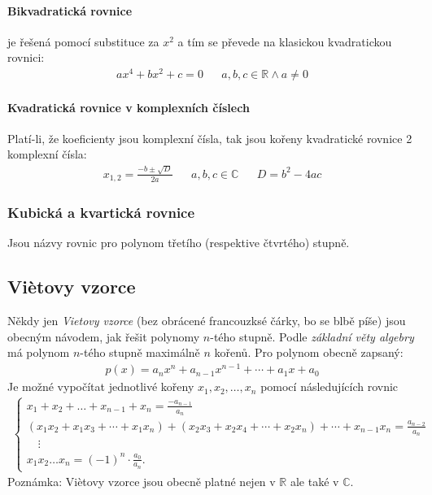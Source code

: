\documentclass[12pt]{article}
\newcommand{\nR}{\mathbb{R}} %
\newcommand{\nC}{\mathbb{C}} %
\begin{document}
\paragraph{Bikvadratická rovnice} je řešená pomocí substituce za $x^2$ a tím se převede na klasickou kvadratickou rovnici:
\begin{align}
ax^4 + bx^2 + c =0 && a,b,c \in \nR \land a \neq 0
\end{align}
\paragraph{Kvadratická rovnice v komplexních číslech}
Platí-li, že koeficienty jsou komplexní čísla, tak jsou kořeny kvadratické rovnice 2 komplexní čísla:
\begin{align}
x_{{1,2}}= \frac  {-b\pm {\sqrt  {D}}}{2a} && a,b,c \in \nC && D=b^{2}-4ac
\end{align}

\subsubsection{Kubická a kvartická rovnice}
Jsou názvy rovnic pro polynom třetího (respektive čtvrtého) stupně.
\subsection{Viètovy vzorce}
\label{sec:vietovy_vzorce}
Někdy jen \emph{Vietovy vzorce} (bez obrácené francouzksé čárky, bo se blbě píše) jsou obecným návodem, jak řešit polynomy $n$-tého stupně. Podle \emph{základní věty algebry} má polynom $n$-tého stupně maximálně $n$ kořenů. Pro polynom obecně zapsaný:
\begin{align}
p(x)=a_{n}x^{n}+a_{n-1}x^{n-1}+\cdots +a_{1}x+a_{0}
\end{align}
Je možné vypočítat jednotlivé kořeny $x_1, x_2, \dotsc , x_n$ pomocí následujících rovnic
\begin{align}
\begin{cases}
x_{1}+x_{2}+\dots +x_{n-1}+x_{n}={\tfrac {-a_{n-1}}{a_{n}}}\\(x_{1}x_{2}+x_{1}x_{3}+\cdots +x_{1}x_{n})+(x_{2}x_{3}+x_{2}x_{4}+\cdots +x_{2}x_{n})+\cdots +x_{n-1}x_{n}={\frac {a_{n-2}}{a_{n}}}\\
{}\quad \vdots \\x_{1}x_{2}\dots x_{n}=(-1)^{n} \cdot{\tfrac {a_{0}}{a_{n}}}.\end{cases}
\end{align}
Poznámka: Viètovy vzorce jsou obecně platné nejen v $\nR$ ale také v $\nC$.
\end{document}
